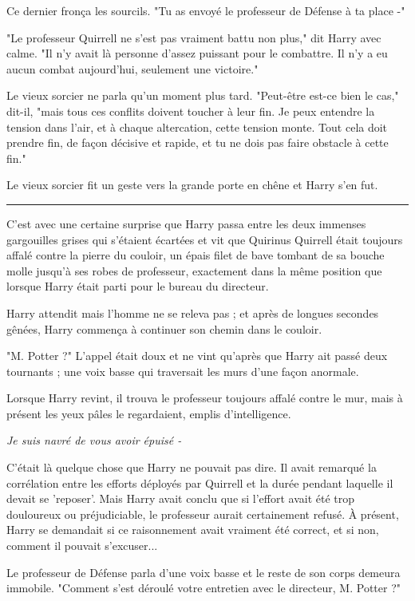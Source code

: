 Ce dernier fronça les sourcils. "Tu as envoyé le professeur de Défense à ta place -"

"Le professeur Quirrell ne s'est pas vraiment battu non plus," dit Harry avec calme. "Il n'y avait là personne d'assez puissant pour le combattre. Il n'y a eu aucun combat aujourd'hui, seulement une victoire."

Le vieux sorcier ne parla qu'un moment plus tard. "Peut-être est-ce bien le cas," dit-il, "mais tous ces conflits doivent toucher à leur fin. Je peux entendre la tension dans l'air, et à chaque altercation, cette tension monte. Tout cela doit prendre fin, de façon décisive et rapide, et tu ne dois pas faire obstacle à cette fin."

Le vieux sorcier fit un geste vers la grande porte en chêne et Harry s'en fut.
\par\noindent\rule{\textwidth}{0.4pt}
C'est avec une certaine surprise que Harry passa entre les deux immenses gargouilles grises qui s'étaient écartées et vit que Quirinus Quirrell était toujours affalé contre la pierre du couloir, un épais filet de bave tombant de sa bouche molle jusqu'à ses robes de professeur, exactement dans la même position que lorsque Harry était parti pour le bureau du directeur.

Harry attendit mais l'homme ne se releva pas ; et après de longues secondes gênées, Harry commença à continuer son chemin dans le couloir.

"M. Potter ?" L'appel était doux et ne vint qu'après que Harry ait passé deux tournants ; une voix basse qui traversait les murs d'une façon anormale.

Lorsque Harry revint, il trouva le professeur toujours affalé contre le mur, mais à présent les yeux pâles le regardaient, emplis d'intelligence.

\emph{Je suis navré de vous avoir épuisé -} 

C'était là quelque chose que Harry ne pouvait pas dire. Il avait remarqué la corrélation entre les efforts déployés par Quirrell et la durée pendant laquelle il devait se 'reposer'. Mais Harry avait conclu que si l'effort avait été trop douloureux ou préjudiciable, le professeur aurait certainement refusé. À présent, Harry se demandait si ce raisonnement avait vraiment été correct, et si non, comment il pouvait s'excuser...

Le professeur de Défense parla d'une voix basse et le reste de son corps demeura immobile. "Comment s'est déroulé votre entretien avec le directeur, M. Potter ?"

